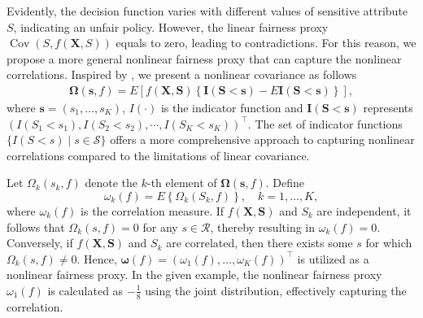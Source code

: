 \documentclass[12pt]{article}
\theoremstyle{plain}
\theoremstyle{definition}
\theoremstyle{remark}
\begin{document}
Evidently, the decision function varies with different values of sensitive attribute $S$, indicating an unfair policy. However, the linear fairness proxy $\operatorname{Cov}\left({S}, f(\boldsymbol{X}, {S})\right)$ equals to zero, leading to contradictions. For this reason, we propose a more general nonlinear fairness proxy that can capture the nonlinear correlations. Inspired by \cite{zhuliping2011}, we present a nonlinear covariance as follows
\begin{equation}
\begin{aligned}
\boldsymbol{\Omega}(\boldsymbol{s},f)=E[ f(\boldsymbol{X}, \boldsymbol{S})\left\{\boldsymbol{I}(\boldsymbol{S}<\boldsymbol{s})-E\boldsymbol{I}(\boldsymbol{S}<\boldsymbol{s})\right\}],
\nonumber
\end{aligned}
\end{equation}
where $\boldsymbol{s}=(s_1,  \ldots, s_K)$, $I(\cdot)$ is the indicator function and $\boldsymbol{I}(\boldsymbol{S}<\boldsymbol{s}) $ represents $(I({S}_1<{s}_1), I({S}_2<{s}_2), \cdots, I({S}_K<{s}_K) )^\top$. The set of indicator functions $\{ {I}({S}<s) \mid s \in \mathcal{S} \}$ offers a more comprehensive approach to capturing nonlinear correlations compared to the limitations of linear covariance.

Let $\Omega_k({s}_k,f)$ denote the $k$-th element of $\boldsymbol{\Omega}(\boldsymbol{s},f)$. Define
$$
\omega_k(f)=E\left\{\Omega_k({S}_k,f)\right\}, \quad k=1, \ldots, K,
$$
where $\omega_k(f)$ is the correlation measure. If $f(\boldsymbol{X}, \boldsymbol{S})$ and ${S}_k$ are independent, it follows that $\Omega_k({s},f)=0$ for any ${s} \in \mathcal{R}$, thereby resulting in $\omega_k(f)=0$. Conversely, if $f(\boldsymbol{X}, \boldsymbol{S})$ and ${S}_k$ are correlated, then there exists some ${s}$ for which $\Omega_k(s,f) \neq 0$. Hence, $\boldsymbol{\omega}(f)=(\omega_1(f),  \ldots, {\omega}_K(f))^\top$ is utilized as a nonlinear fairness proxy. In the given example, the nonlinear fairness proxy $\omega_1(f)$ is calculated as $-\frac{1}{8}$ using the joint distribution, effectively capturing the correlation.

\end{document}
